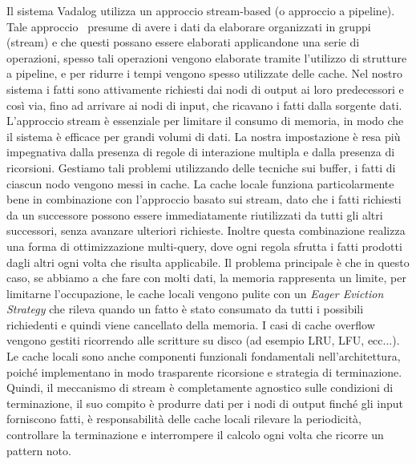 Il sistema Vadalog utilizza un approccio stream-based (o approccio a pipeline). Tale approccio~\cite{WIKI:STREAM} presume di avere i dati da elaborare organizzati in gruppi (stream) e che questi possano essere elaborati applicandone una serie di operazioni, spesso tali operazioni vengono elaborate tramite l'utilizzo di strutture a pipeline, e per ridurre i tempi vengono spesso utilizzate delle cache. \newline
Nel nostro sistema i fatti sono attivamente richiesti dai nodi di output ai loro predecessori e così via, fino ad arrivare ai nodi di input, che ricavano i fatti dalla sorgente dati. L'approccio stream è essenziale per limitare il consumo di memoria, in modo che il sistema è efficace per grandi volumi di dati. \newline
La nostra impostazione è resa più impegnativa dalla presenza di regole di interazione multipla e dalla presenza di ricorsioni. \newline
Gestiamo tali problemi utilizzando delle tecniche sui buffer, i fatti di ciascun nodo vengono messi in cache. \newline
La cache locale funziona particolarmente bene in combinazione con l'approccio basato sui stream, dato che i fatti richiesti da un successore possono essere immediatamente riutilizzati da tutti gli altri successori, senza avanzare ulteriori richieste. Inoltre questa combinazione realizza una forma di ottimizzazione multi-query, dove ogni regola sfrutta i fatti prodotti dagli altri ogni volta che risulta applicabile. \newline
Il problema principale è che in questo caso, se abbiamo a che fare con molti dati, la memoria rappresenta un limite, per limitarne l'occupazione, le cache locali vengono pulite con un \textit{Eager Eviction Strategy} che rileva quando un fatto è stato consumato da tutti i possibili richiedenti e quindi viene cancellato della memoria. \newline
I casi di cache overflow vengono gestiti ricorrendo alle scritture su disco (ad esempio LRU, LFU, ecc...). \newline
Le cache locali sono anche componenti funzionali fondamentali nell'architettura, poiché implementano in modo trasparente ricorsione e strategia di terminazione. \newline
Quindi, il meccanismo di stream è completamente agnostico sulle condizioni di terminazione, il suo compito è produrre dati per i nodi di output finché gli input forniscono fatti, è responsabilità delle cache locali rilevare la periodicità, controllare la terminazione e interrompere il calcolo ogni volta che ricorre un pattern noto. \newline

